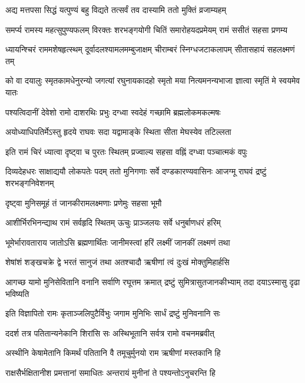 \twolineshloka
{अद्य मत्तपसा सिद्धं यत्पुण्यं बहु विद्यते}
{तत्सर्वं तव दास्यामि ततो मुक्तिं व्रजाम्यहम्} %

\fourlineindentedshloka
{समर्प्य रामस्य महत्सुपुण्यफलम्}
{विरक्तः शरभङ्गयोगी}
{चितिं समारोहयदप्रमेयम्}
{रामं ससीतं सहसा प्रणम्य} %

\fourlineindentedshloka
{ध्यायन्श्चिरं राममशेषहृत्स्थम्}
{दूर्वादलश्यामलमम्बुजाक्षम्}
{चीराम्बरं स्निग्धजटाकलापम्}
{सीतासहायं सहलक्ष्मणं तम्} %

\fourlineindentedshloka
{को वा दयालुः स्मृतकामधेनुरन्यो}
{जगत्यां रघुनायकादहो}
{स्मृतो मया नित्यमनन्यभाजा}
{ज्ञात्वा स्मृतिं मे स्वयमेव यातः} %

\twolineshloka
{पश्यत्विदानीं देवेशो रामो दाशरथिः प्रभुः}
{दग्ध्वा स्वदेहं गच्छामि ब्रह्मलोकमकल्मषः} %

\twolineshloka
{अयोध्याधिपतिर्मेऽस्तु हृदये राघवः सदा}
{यद्वामाङ्के स्थिता सीता मेघस्येव तटिल्लता} %

\twolineshloka
{इति रामं चिरं ध्यात्वा दृष्ट्वा च पुरतः स्थितम्}
{प्रज्वाल्य सहसा वह्निं दग्ध्वा पञ्चात्मकं वपुः} %

\threelineshloka
{दिव्यदेहधरः साक्षाद्ययौ लोकपतेः पदम्}
{ततो मुनिगणाः सर्वे दण्डकारण्यवासिनः}
{आजग्मू राघवं द्रष्टुं शरभङ्गनिवेशनम्} %

\twolineshloka
{दृष्ट्वा मुनिसमूहं तं जानकीरामलक्ष्मणाः}
{प्रणेमुः सहसा भूमौ} %

\twolineshloka
{आशीर्भिरभिनन्द्याथ रामं सर्वहृदि स्थितम्}
{ऊचुः प्राञ्जलयः सर्वे धनुर्बाणधरं हरिम्} %

\twolineshloka
{भूमेर्भारावताराय जातोऽसि ब्रह्मणार्थितः}
{जानीमस्त्वां हरिं लक्ष्मीं जानकीं लक्ष्मणं तथा} %

\twolineshloka
{शेषांशं शङ्खचक्रे द्वे भरतं सानुजं तथा}
{अतश्चादौ ऋषीणां त्वं दुःखं मोक्तुमिहार्हसि} %

\fourlineindentedshloka
{आगच्छ यामो मुनिसेवितानि}
{वनानि सर्वाणि रघूत्तम क्रमात्}
{द्रष्टुं सुमित्रासुतजानकीभ्याम्}
{तदा दयाऽस्मासु दृढा भविष्यति} %

\twolineshloka
{इति विज्ञापितो रामः कृताञ्जलिपुटैर्विभुः}
{जगाम मुनिभिः सार्धं द्रष्टुं मुनिवनानि सः} %

\twolineshloka
{ददर्श तत्र पतितान्यनेकानि शिरांसि सः}
{अस्थिभूतानि सर्वत्र रामो वचनमब्रवीत्} %

\twolineshloka
{अस्थीनि केषामेतानि किमर्थं पतितानि वै}
{तमूचुर्मुनयो राम ऋषीणां मस्तकानि हि} %

\twolineshloka
{राक्षसैर्भक्षितानीश प्रमत्तानां समाधितः}
{अन्तरायं मुनीनां ते पश्यन्तोऽनुचरन्ति हि} %

